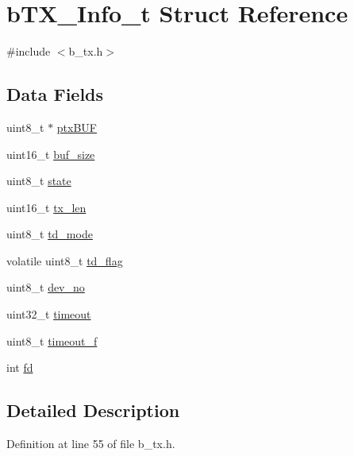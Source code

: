 \hypertarget{structb_t_x___info__t}{}\section{b\+T\+X\+\_\+\+Info\+\_\+t Struct Reference}
\label{structb_t_x___info__t}


{\ttfamily \#include $<$b\+\_\+tx.\+h$>$}

\subsection*{Data Fields}
\begin{DoxyCompactItemize}
\item 
uint8\+\_\+t $\ast$ \mbox{\hyperlink{structb_t_x___info__t_a6b7bb0a51ce5c98f55cd1390bab93b9d}{ptx\+B\+UF}}
\item 
uint16\+\_\+t \mbox{\hyperlink{structb_t_x___info__t_adae01b8e5362764fe757f02f6db4d91e}{buf\+\_\+size}}
\item 
uint8\+\_\+t \mbox{\hyperlink{structb_t_x___info__t_a0b57aa10271a66f3dc936bba1d2f3830}{state}}
\item 
uint16\+\_\+t \mbox{\hyperlink{structb_t_x___info__t_abf7d061f271985d073bcf0578093ea45}{tx\+\_\+len}}
\item 
uint8\+\_\+t \mbox{\hyperlink{structb_t_x___info__t_a8b731ab3cbae9b42194b3ddda07c862a}{td\+\_\+mode}}
\item 
volatile uint8\+\_\+t \mbox{\hyperlink{structb_t_x___info__t_a90801bc7db78f2b94681975bd2ffd518}{td\+\_\+flag}}
\item 
uint8\+\_\+t \mbox{\hyperlink{structb_t_x___info__t_a858e2685fb0034acadcd8d48cf6f02b2}{dev\+\_\+no}}
\item 
uint32\+\_\+t \mbox{\hyperlink{structb_t_x___info__t_ab5627d8d8b095c198e2523c44ca380ac}{timeout}}
\item 
uint8\+\_\+t \mbox{\hyperlink{structb_t_x___info__t_a06a8a7ab5d60a21b5357adad4eb93393}{timeout\+\_\+f}}
\item 
int \mbox{\hyperlink{structb_t_x___info__t_a6f8059414f0228f0256115e024eeed4b}{fd}}
\end{DoxyCompactItemize}


\subsection{Detailed Description}


Definition at line 55 of file b\+\_\+tx.\+h.



